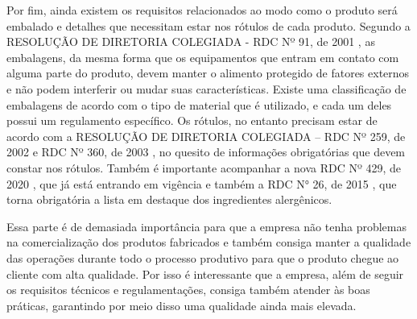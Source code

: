\documentclass[
	12pt,				%
	openright,			%
	oneside,			%
	a4paper,			%
	english,			%
	french,				%
	spanish,			%
	brazil				%
	]{abntex2}
\begin{document}
Por fim, ainda existem os requisitos relacionados ao modo como o produto será embalado e detalhes que necessitam estar nos rótulos de cada produto. Segundo a RESOLUÇÃO DE DIRETORIA COLEGIADA - RDC Nº 91, de 2001 \cite{anvisa91}, as embalagens, da mesma forma que os equipamentos que entram em contato com alguma parte do produto, devem manter o alimento protegido de fatores externos e não podem interferir ou mudar suas características. Existe uma classificação de embalagens de acordo com o tipo de material que é utilizado, e cada um deles possui um regulamento específico. Os rótulos, no entanto precisam estar de acordo com a RESOLUÇÃO DE DIRETORIA COLEGIADA – RDC Nº 259, de 2002 \cite{anvisa259} e RDC Nº 360, de 2003 \cite{anvisa360}, no quesito de informações obrigatórias que devem constar nos rótulos. Também é importante acompanhar a nova RDC Nº 429, de 2020 \cite{anvisa429}, que já está entrando em vigência e também a RDC N° 26, de 2015 \cite{anvisa26}, que torna obrigatória a lista em destaque dos ingredientes alergênicos.     

Essa parte é de demasiada importância para que a empresa não tenha problemas na comercialização dos produtos fabricados e também consiga manter a qualidade das operações durante todo o processo produtivo para que o produto chegue ao cliente com alta qualidade. Por isso é interessante que a empresa, além de seguir os requisitos técnicos e regulamentações, consiga também atender às boas práticas, garantindo por meio disso uma qualidade ainda mais elevada.
\end{document}
